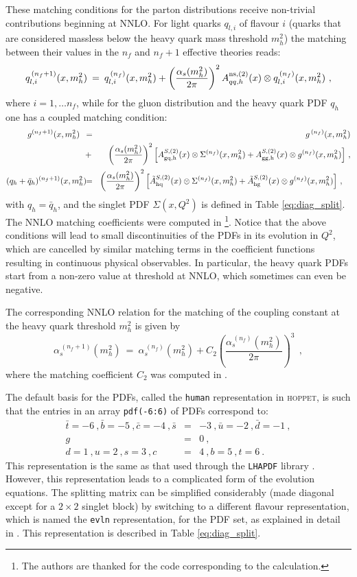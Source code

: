 \documentclass[12pt]{article}
\newcommand{\be}{\begin{equation}}
\newcommand{\ee}{\end{equation}}
\newcommand{\bea}{\begin{eqnarray}}
\newcommand{\eea}{\end{eqnarray}}
\newcommand{\lp}{\left(}
\newcommand{\rp}{\right)}
\newcommand{\nf}{n_f)}
\newcommand{\nn}{\nonumber}
\newcommand{\as}{\alpha_s}
\newcommand{\hoppet}{\textsc{hoppet}\xspace}
\newcommand{\ttt}[1]{\texttt{#1}}
\begin{document}
These matching conditions for the parton distributions
receive non-trivial contributions beginning at NNLO.
For light quarks $q_{l,i}$ of flavour $i$ 
(quarks that are considered massless
below the heavy quark mass threshold $m_h^2$) the matching between
their values in the $n_f$ and
$n_f+1$ effective theories reads:
\be
\label{eq:lp-nf1}
  q_{l,i}^{\,(n_f+1)}(x,m_h^2) \: = \:  q_{l,i}^{\,(\nf}(x,m_h^2) +
\lp \frac{\alpha_s(m_h^2)}{2\pi} \rp^2
   A^{\rm ns,(2)}_{qq,h}(x) \otimes
  q_{l,i}^{\, (\nf}(x,m_h^2) \ ,
\ee
where  $i = 1,\ldots n_f$, while for the gluon
distribution and the heavy quark PDF $q_h$ one has a coupled matching 
condition:
\bea
\label{eq:hp-nf1}
  g^{(n_f+1)}(x,m_h^2) \:\:\: &\! = \!\! &
    g^{\, (\nf}(x,m_h^2) 
\\ &+& \lp \frac{\alpha_s(m_h^2)}{2\pi} \rp^2 \Big[
    A_{\rm gq,h}^{S,(2)}(x) \otimes \Sigma^{(\nf}(x,m_h^2) +
    A_{\rm gg,h}^{S,(2)}(x) \otimes g^{(\nf}(x,m_h^2) \Big ]\ ,
  \nn \\[0.5mm] 
  (q_h+\bar{q}_{h})^{(n_f+1)}(x,m_h^2) \! &\! =\!\! &
   \lp \frac{\alpha_s(m_h^2)}{2\pi} \rp^2 \Big [
    \tilde{A}_{\rm hq}^{S,(2)}(x)\otimes \Sigma^{(\nf}(x,m_h^2) 
    + \tilde{A}_{\rm hg}^{S,(2)}(x)\otimes g^{(\nf}(x,m_h^2) \Big  ] \ ,
  \quad \nonumber
\eea
with $q_h=\bar{q}_h$, and the singlet PDF $\Sigma(x,Q^2)$ is defined
in Table \ref{eq:diag_split}.
The NNLO matching coefficients were
computed in \cite{NNLO-MTM}\footnote{The authors are thanked 
for the code corresponding to the
calculation.}.
Notice that the above conditions will lead to small discontinuities
of the PDFs in its evolution in $Q^2$, 
which are cancelled by similar matching terms
in the coefficient functions resulting in continuous physical
observables. In particular, the heavy quark PDFs start from a non-zero
value at threshold at NNLO, which sometimes can even be
negative.

The corresponding NNLO relation for the matching of the coupling constant 
at the heavy quark threshold $m^2_h$ is given by
\be
\label{eq:as-nf1}
  \as^{\, (n_f+1)}(m_h^2) \: = \:
  \as^{\, (\nf} (m_h^2) +   C_2 \lp \frac{\as^{\, (\nf} (m_h^2)}{2\pi} \rp^3
   \:\: ,
\ee
where the matching coefficient $C_2$ was computed in \cite{Chetyrkin:1997sg}.


The default basis for the PDFs, called the \ttt{human} 
representation in \hoppet, is such that 
 the entries in an array
\ttt{pdf(-6:6)} of PDFs correspond to:
\bea 
\bar t={-6} \ ,  \bar b={-5} \ ,  \bar c={-4}
\ , \nn   \bar s&=&{-3} \ , \nn  \bar u={-2} \ , \nn
 \bar d={-1} \ , \\  g&=&{0} \ , \\ \nn   d={1} \ , \nn  u={2} 
\ , \nn  
s={3} \ , \nn   c&=&{4} \ , \nn b={5} \ , \nn  t={6} \ . \nn 
\eea
 This representation is the
same as that used through the \ttt{LHAPDF} library \cite{LHAPDF}. 
However, this representation leads
to a complicated form of the evolution equations.
The splitting matrix can be simplified considerably (made diagonal
except for a $2\times2$ singlet block) by switching to a different
flavour representation, which is named
the \ttt{evln} representation, for the PDF set, as explained in detail in
\cite{vanNeerven:1999ca,vanNeerven:2000uj}. This representation
is described in Table \ref{eq:diag_split}.
\end{document}
